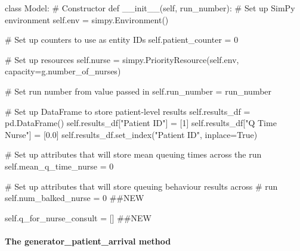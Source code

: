 \documentclass[
  letterpaper,
  DIV=11,
  numbers=noendperiod]{scrreprt}
\let\oldparagraph\paragraph
\renewcommand{\paragraph}[1]{\oldparagraph{#1}\mbox{}}
\newenvironment{Shaded}{\begin{snugshade}}{\end{snugshade}}
\newcommand{\CommentTok}[1]{\textcolor[rgb]{0.37,0.37,0.37}{#1}}
\newcommand{\DecValTok}[1]{\textcolor[rgb]{0.68,0.00,0.00}{#1}}
\newcommand{\FloatTok}[1]{\textcolor[rgb]{0.68,0.00,0.00}{#1}}
\newcommand{\FunctionTok}[1]{\textcolor[rgb]{0.28,0.35,0.67}{#1}}
\newcommand{\KeywordTok}[1]{\textcolor[rgb]{0.00,0.23,0.31}{#1}}
\newcommand{\NormalTok}[1]{\textcolor[rgb]{0.00,0.23,0.31}{#1}}
\newcommand{\OperatorTok}[1]{\textcolor[rgb]{0.37,0.37,0.37}{#1}}
\newcommand{\StringTok}[1]{\textcolor[rgb]{0.13,0.47,0.30}{#1}}
\newcommand{\VariableTok}[1]{\textcolor[rgb]{0.07,0.07,0.07}{#1}}
\begin{document}
\begin{Shaded}
\begin{Highlighting}[]
\KeywordTok{class}\NormalTok{ Model:}
    \CommentTok{\# Constructor}
    \KeywordTok{def} \FunctionTok{\_\_init\_\_}\NormalTok{(}\VariableTok{self}\NormalTok{, run\_number):}
        \CommentTok{\# Set up SimPy environment}
        \VariableTok{self}\NormalTok{.env }\OperatorTok{=}\NormalTok{ simpy.Environment()}

        \CommentTok{\# Set up counters to use as entity IDs}
        \VariableTok{self}\NormalTok{.patient\_counter }\OperatorTok{=} \DecValTok{0}

        \CommentTok{\# Set up resources}
        \VariableTok{self}\NormalTok{.nurse }\OperatorTok{=}\NormalTok{ simpy.PriorityResource(}\VariableTok{self}\NormalTok{.env,}
\NormalTok{                                            capacity}\OperatorTok{=}\NormalTok{g.number\_of\_nurses)}

        \CommentTok{\# Set run number from value passed in}
        \VariableTok{self}\NormalTok{.run\_number }\OperatorTok{=}\NormalTok{ run\_number}

        \CommentTok{\# Set up DataFrame to store patient{-}level results}
        \VariableTok{self}\NormalTok{.results\_df }\OperatorTok{=}\NormalTok{ pd.DataFrame()}
        \VariableTok{self}\NormalTok{.results\_df[}\StringTok{"Patient ID"}\NormalTok{] }\OperatorTok{=}\NormalTok{ [}\DecValTok{1}\NormalTok{]}
        \VariableTok{self}\NormalTok{.results\_df[}\StringTok{"Q Time Nurse"}\NormalTok{] }\OperatorTok{=}\NormalTok{ [}\FloatTok{0.0}\NormalTok{]}
        \VariableTok{self}\NormalTok{.results\_df.set\_index(}\StringTok{"Patient ID"}\NormalTok{, inplace}\OperatorTok{=}\VariableTok{True}\NormalTok{)}

        \CommentTok{\# Set up attributes that will store mean queuing times across the run}
        \VariableTok{self}\NormalTok{.mean\_q\_time\_nurse }\OperatorTok{=} \DecValTok{0}

        \CommentTok{\# Set up attributes that will store queuing behaviour results across}
        \CommentTok{\# run}
        \VariableTok{self}\NormalTok{.num\_balked\_nurse }\OperatorTok{=} \DecValTok{0} \CommentTok{\#\#NEW}

        \VariableTok{self}\NormalTok{.q\_for\_nurse\_consult }\OperatorTok{=}\NormalTok{ [] }\CommentTok{\#\#NEW}
\end{Highlighting}
\end{Shaded}

\paragraph{The generator\_patient\_arrival
method}\label{the-generator_patient_arrival-method}
\end{document}
